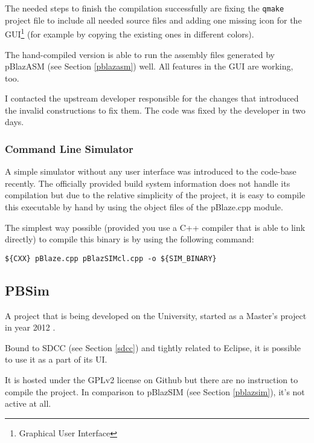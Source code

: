             The needed steps to finish the compilation successfully are fixing the \texttt{qmake} project file to include all needed source files and adding one missing icon for the GUI\footnote{Graphical User Interface} (for example by copying the existing ones in different colors).

            The hand-compiled version is able to run the assembly files generated by pBlazASM (see Section \ref{pblazasm}) well. All features in the GUI are working, too.

            I contacted the upstream developer responsible for the changes that introduced the invalid constructions to fix them. The code was fixed by the developer in two days.

            \subsubsection{Command Line Simulator}

            A simple simulator without any user interface was introduced to the code-base recently. The officially provided build system information does not handle its compilation but due to the relative simplicity of the project, it is easy to compile this executable by hand by using the object files of the pBlaze.cpp module.

            The simplest way possible (provided you use a C++ compiler that is able to link directly) to compile this binary is by using the following command:

            \begin{center}
                \texttt{\$\{CXX\} pBlaze.cpp pBlazSIMcl.cpp -o \$\{SIM\_BINARY\}}
            \end{center}

        \subsection{PBSim}\label{pbsim}

        A project that is being developed on the University, started as a Master's project in year 2012 \cite{PbsimProj}.

        Bound to SDCC (see Section \ref{sdcc}) and tightly related to Eclipse, it is possible to use it as a part of its UI.

        It is hosted under the GPLv2 license on Github \cite{PbsimRepo} but there are no instruction to compile the project. In comparison to pBlazSIM (see Section \ref{pblazsim}), it's not active at all.

